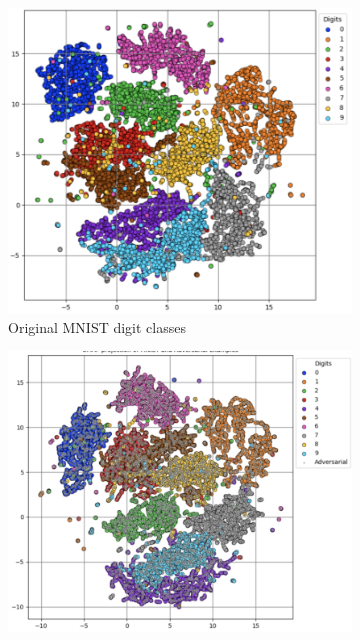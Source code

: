 \documentclass[10pt, conference, a4paper, final]{IEEEtran}
\begin{document}
\begin{figure}[!ht]
    \centering
    \begin{subfigure}{.31\textwidth}
        \centering
        \includegraphics[width=\linewidth]{paper_images/UMAP_mnist.png}
        \caption{Original MNIST digit classes}
        \label{fig:umap_original}
    \end{subfigure}%
    \hfill
    \begin{subfigure}{.34\textwidth}
        \centering
        \includegraphics[width=\linewidth]{paper_images/UMAP_adv.png}

\end{subfigure}
\end{figure}
\end{document}
